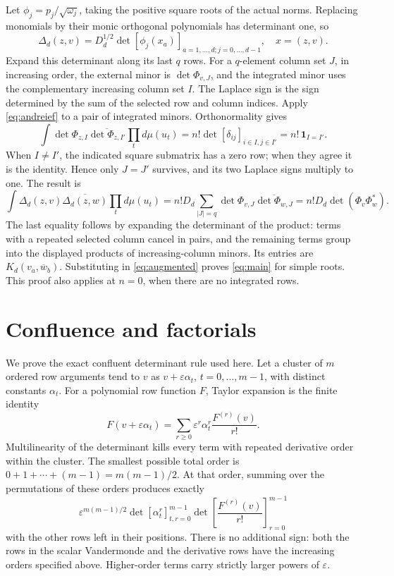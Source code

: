 \documentclass[11pt]{article}
\begin{document}
Let \(\phi_j=p_j/\sqrt{\omega_j}\), taking the positive square roots of
the actual norms. Replacing monomials by their monic orthogonal
polynomials has determinant one, so
\[
 \Delta_d(z,v)=D_d^{1/2}\det[\phi_j(x_a)]_{a=1,\ldots,d; j=0,\ldots,d-1},
 \quad x=(z,v).
\]
Expand this determinant along its last \(q\) rows. For a \(q\)-element
column set \(J\), in increasing order, the external minor is
\(\det\Phi_{v,J}\), and the integrated minor uses the complementary
increasing column set \(I\). The Laplace sign is the sign determined by
the sum of the selected row and column indices. Apply
\eqref{eq:andreief} to a pair of integrated minors. Orthonormality gives
\[
 \int\det\Phi_{z,I}\overline{\det\Phi_{z,I'}}\prod_t d\mu(u_t)
   =n!\det[\delta_{ij}]_{i\in I,j\in I'}
   =n!\,\mathbf1_{I=I'}.
\]
When \(I\ne I'\), the indicated square submatrix has a zero row;
when they agree it is the identity. Hence only \(J=J'\) survives, and
its two Laplace signs multiply to one. The result is
\[
 \int\Delta_d(z,v)\overline{\Delta_d(z,w)}\prod_t d\mu(u_t)
  =n!D_d\sum_{|J|=q}\det\Phi_{v,J}\overline{\det\Phi_{w,J}}
  =n!D_d\det(\Phi_v\Phi_w^*).
\]
The last equality follows by expanding the determinant of the product:
terms with a repeated selected column cancel in pairs, and the remaining
terms group into the displayed products of increasing-column minors.
Its entries are \(K_d(v_a,\overline w_b)\). Substituting in
\eqref{eq:augmented} proves \eqref{eq:main} for simple roots. This proof
also applies at \(n=0\), when there are no integrated rows.

\section{Confluence and factorials}\label{sec:confluence}

We prove the exact confluent determinant rule used here. Let a cluster
of \(m\) ordered row arguments tend to \(v\) as
\(v+\varepsilon\alpha_t\), \(t=0,\ldots,m-1\), with distinct constants
\(\alpha_t\). For a polynomial row function \(F\), Taylor expansion is
the finite identity
\[
 F(v+\varepsilon\alpha_t)
  =\sum_{r\geq0}\varepsilon^r\alpha_t^r\frac{F^{(r)}(v)}{r!}.
\]
Multilinearity of the determinant kills every term with repeated
derivative order within the cluster. The smallest possible total order
is \(0+1+\cdots+(m-1)=m(m-1)/2\). At that order, summing over the
permutations of these orders produces exactly
\[
 \varepsilon^{m(m-1)/2}
  \det[\alpha_t^r]_{t,r=0}^{m-1}
  \det\left[\frac{F^{(r)}(v)}{r!}\right]_{r=0}^{m-1}
\]
with the other rows left in their positions. There is no additional
sign: both the rows in the scalar Vandermonde and the derivative rows
have the increasing orders specified above. Higher-order terms carry
strictly larger powers of \(\varepsilon\).
\end{document}
